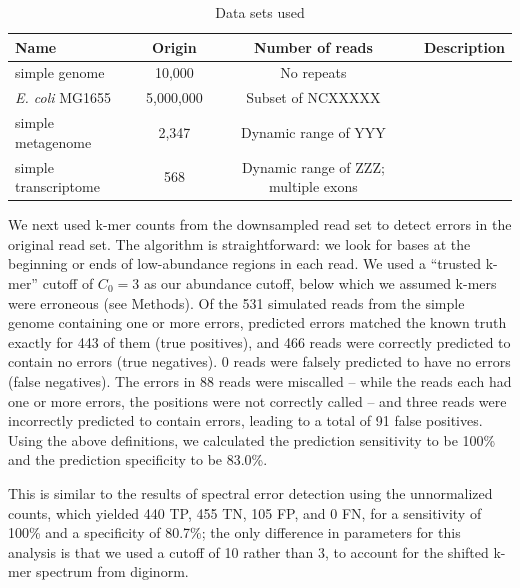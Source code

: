 \documentclass{article}
\begin{document}


\begin{table}
\begin{tabular}{|l|c|c|l|}
\hline
Name & Origin & Number of reads & Description \\
\hline
simple genome & 10,000 & No repeats\\
{\em E. coli} MG1655 & 5,000,000 & Subset of NCXXXXX \\
simple metagenome & 2,347 & Dynamic range of YYY \\
simple transcriptome & 568 & Dynamic range of ZZZ; multiple exons\\
\hline
\end{tabular}
\label{tab:data}

\caption{Data sets used}
\end{table}

We next used k-mer counts from the downsampled read set to detect
errors in the original read set.  The algorithm is straightforward: we
look for bases at the beginning or ends of low-abundance regions in
each read. We used a ``trusted k-mer'' cutoff of $C_0 = 3$ as our
abundance cutoff, below which we assumed k-mers were erroneous (see
Methods).  Of the 531 simulated reads from the simple genome
containing one or more errors, predicted errors matched the known
truth exactly for 443 of them (true positives), and 466 reads were
correctly predicted to contain no errors (true negatives). 0 reads
were falsely predicted to have no errors (false negatives). The errors
in 88 reads were miscalled -- while the reads each had one or more
errors, the positions were not correctly called -- and three reads
were incorrectly predicted to contain errors, leading to a total of 91
false positives.  Using the above definitions, we calculated the
prediction sensitivity to be 100\% and the prediction specificity to
be 83.0\%.


This is similar to the results of spectral error detection using the
unnormalized counts, which yielded 440 TP, 455 TN, 105 FP, and 0 FN,
for a sensitivity of 100\% and a specificity of 80.7\%; the only
difference in parameters for this analysis is that we used a cutoff of
10 rather than 3, to account for the shifted k-mer spectrum from
diginorm.
\end{document}
